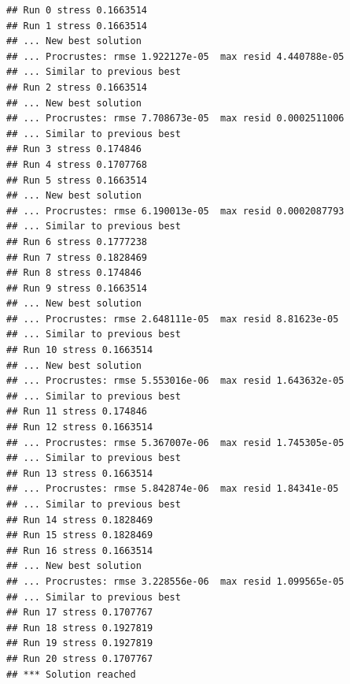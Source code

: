 \documentclass[
]{article}
\begin{document}
\begin{verbatim}
## Run 0 stress 0.1663514 
## Run 1 stress 0.1663514 
## ... New best solution
## ... Procrustes: rmse 1.922127e-05  max resid 4.440788e-05 
## ... Similar to previous best
## Run 2 stress 0.1663514 
## ... New best solution
## ... Procrustes: rmse 7.708673e-05  max resid 0.0002511006 
## ... Similar to previous best
## Run 3 stress 0.174846 
## Run 4 stress 0.1707768 
## Run 5 stress 0.1663514 
## ... New best solution
## ... Procrustes: rmse 6.190013e-05  max resid 0.0002087793 
## ... Similar to previous best
## Run 6 stress 0.1777238 
## Run 7 stress 0.1828469 
## Run 8 stress 0.174846 
## Run 9 stress 0.1663514 
## ... New best solution
## ... Procrustes: rmse 2.648111e-05  max resid 8.81623e-05 
## ... Similar to previous best
## Run 10 stress 0.1663514 
## ... New best solution
## ... Procrustes: rmse 5.553016e-06  max resid 1.643632e-05 
## ... Similar to previous best
## Run 11 stress 0.174846 
## Run 12 stress 0.1663514 
## ... Procrustes: rmse 5.367007e-06  max resid 1.745305e-05 
## ... Similar to previous best
## Run 13 stress 0.1663514 
## ... Procrustes: rmse 5.842874e-06  max resid 1.84341e-05 
## ... Similar to previous best
## Run 14 stress 0.1828469 
## Run 15 stress 0.1828469 
## Run 16 stress 0.1663514 
## ... New best solution
## ... Procrustes: rmse 3.228556e-06  max resid 1.099565e-05 
## ... Similar to previous best
## Run 17 stress 0.1707767 
## Run 18 stress 0.1927819 
## Run 19 stress 0.1927819 
## Run 20 stress 0.1707767 
## *** Solution reached
\end{verbatim}
\end{document}
